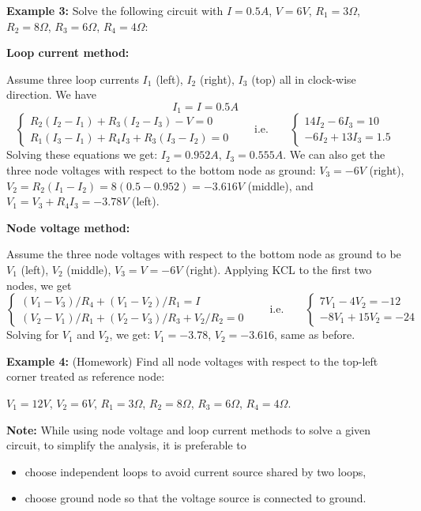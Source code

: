 {\bf Example 3:} Solve the following circuit with $I=0.5 A$, $V=6 V$, 
$R_1=3\Omega$, $R_2=8\Omega$, $R_3=6\Omega$, $R_4=4\Omega$:



{\bf Loop current method:}

Assume three loop currents $I_1$ (left), $I_2$ (right), $I_3$ (top) all in 
clock-wise direction. We have
\[ I_1=I=0.5A \]
\[ 
\left\{ \begin{array}{l} R_2(I_2-I_1)+R_3(I_2-I_3)-V=0 \\
  R_1(I_3-I_1)+R_4I_3+R_3(I_3-I_2)=0 \end{array} \right. 
\;\;\;\;\;\;\;\mbox{i.e.}\;\;\;\;\;\;\;
\left\{ \begin{array}{l}
  14 I_2-6 I_3=10 \\   -6 I_2+13 I_3=1.5 \end{array} \right. 
\]
Solving these equations we get: $I_2=0.952 A$, $I_3=0.555 A$. We can also 
get the three node voltages with respect to the bottom node as ground: 
$V_3=-6V$ (right), $V_2=R_2(I_1-I_2)=8(0.5-0.952)=-3.616V$ (middle), and 
$V_1=V_3+R_4 I_3=-3.78 V$ (left). 

{\bf Node voltage method:}

Assume the three node voltages with respect to the bottom node as ground
to be $V_1$ (left), $V_2$ (middle), $V_3=V=-6V$ (right). Applying KCL to 
the first two nodes, we get
\[ 
\left\{ \begin{array}{l}
  (V_1-V_3)/R_4+(V_1-V_2)/R_1=I \\
  (V_2-V_1)/R_1+(V_2-V_3)/R_3+V_2/R_2=0 \end{array} \right. 
  \;\;\;\;\;\;\;\mbox{i.e.}\;\;\;\;\;\;\;
  \left\{ \begin{array}{l}
  7V_1-4V_2=-12 \\
  -8V_1+15V_2=-24 \end{array} \right. \]
Solving for $V_1$ and $V_2$, we get: $V_1=-3.78$, $V_2=-3.616$, same as before.

{\bf Example 4:} (Homework) Find all node voltages with respect to the top-left
corner treated as reference node:


$V_1=12 V$, $V_2=6 V$, $R_1=3 \Omega$, $R_2=8 \Omega$, $R_3=6 \Omega$, $R_4=4\Omega$.


{\bf Note:} While using node voltage and loop current methods to solve a given
circuit, to simplify the analysis, it is preferable to
\begin{itemize}
  \item choose independent loops to avoid current source shared by two loops,
  \item choose ground node so that the voltage source is connected to ground.
\end{itemize}

